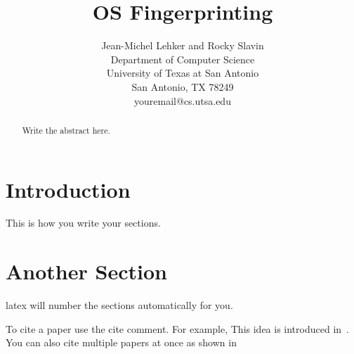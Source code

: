 \documentclass[11pt]{article}
\begin{document}
\title{OS Fingerprinting}

\author{Jean-Michel Lehker and Rocky Slavin\\
        Department of Computer Science\\
        University of Texas at San Antonio\\
        San Antonio, TX 78249\\
        youremail@cs.utsa.edu}

\date{ }
\maketitle 

\begin{abstract}
Write the abstract here.
\end{abstract}

\section{Introduction}
This is how you write your sections.

\section{Another Section}
latex will number the sections automatically for you.

To cite a paper use the cite comment. For example, This
idea is introduced in~\cite{tosuncikm2002}. You can also
cite multiple papers at once as shown 
in~\cite{tosunicme2000,tosuncikm2002,tosunitcc2001,tosunMM01}



\end{document}
